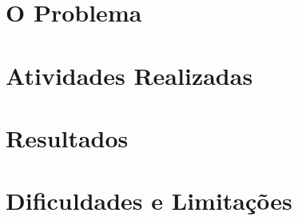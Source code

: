 \section{O Problema}

\section{Atividades Realizadas}

\section{Resultados}

\section{Dificuldades e Limitações}

